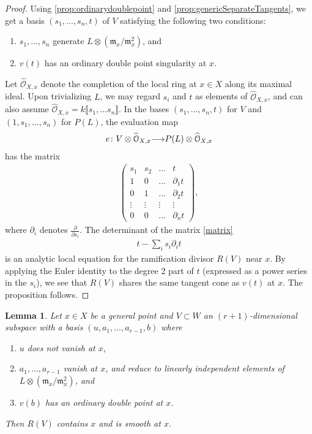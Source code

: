 \documentclass[11pt,reqno]{amsart}
\theoremstyle{plain}
\newtheorem{lemma}[theorem]{Lemma}
\theoremstyle{definition}
\theoremstyle{remark}
\numberwithin{equation}{section}
\renewcommand{\to}{{\longrightarrow}}
\numberwithin{equation}{section}
\renewcommand{\O}{\mathcal O}
\begin{document}
\begin{proof}
  Using \autoref{prop:ordinarydoublepoint} and \autoref{prop:genericSeparateTangents}, we get a basis $(s_{1}, ..., s_{n}, t)$ of $V$ satisfying the following two conditions:
  \begin{enumerate}
      \item $s_{1}, \dots, s_{n}$ generate $L \otimes ({\mathfrak m}_{x}/{\mathfrak m}^{2}_{x})$, and
      \item $v(t)$ has an ordinary double point singularity at $x$.
    \end{enumerate}  

    Let $\widehat{\O}_{X,x}$ denote the completion of the local ring at $x \in X$ along its maximal ideal.  Upon trivializing $L$, we may regard $s_{i}$ and $t$ as elements of $\widehat{\O}_{X,x}$, and can also assume  $\widehat{\O}_{X,x} = k\llbracket s_{1}, \dots s_{n}\rrbracket$.
    In the bases $(s_1, \dots, s_n, t)$ for $V$ and $(1, s_1, \dots, s_n)$ for $P(L)$, the evaluation map 
\begin{align*}
  e\from V \otimes \widehat{\O}_{X,x} \to P(L) \otimes \widehat{\O}_{X,x}
\end{align*}
has the matrix
\begin{align}\label{matrix}
\begin{pmatrix}
  s_{1} & s_{2} & \dots & t \\
  1 & 0 & \dots & \partial_{1}t \\
  0 & 1 & \dots & \partial_{2}t \\
  \vdots & \vdots & \vdots & \vdots \\
  0 & 0 & \dots & \partial_{n}t
\end{pmatrix},
\end{align}
where $\partial_{i}$ denotes $\frac{\partial}{\partial s_{i}}$.
The determinant of the matrix \eqref{matrix}
\begin{align*}
  t - \sum_{i}s_{i}\partial_{i}t
\end{align*}
is an analytic local equation for the ramification divisor $R(V)$ near $x$.
By applying the Euler identity to the degree 2 part of $t$ (expressed as a power series in the $s_i$), we see that $R(V)$ shares the same tangent cone as $v(t)$ at $x$.
The proposition follows.
\end{proof}

\begin{lemma}\label{lem:basepointfree}
  Let $x \in X$ be a general point and $V \subset W$ an $(r+1)$-dimensional subspace with a basis $(u, a_1,\dots, a_{r-1},b)$ where
  \begin{enumerate}
    \item $u$ does not vanish at $x$,
    \item $a_1, \dots , a_{r-1}$ vanish at $x$, and reduce to linearly independent elements of $L \otimes ({\mathfrak m}_{x}/{\mathfrak m}^{2}_{x})$, and
    \item $v(b)$ has an ordinary double point at $x$. 
  \end{enumerate}
  Then $R(V)$ contains $x$ and is smooth at $x$.
\end{lemma}
\end{document}
